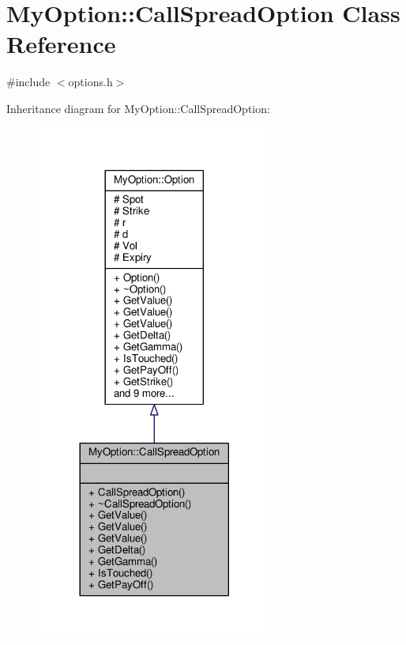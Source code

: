 \hypertarget{classMyOption_1_1CallSpreadOption}{}\section{My\+Option\+:\+:Call\+Spread\+Option Class Reference}
\label{classMyOption_1_1CallSpreadOption}


{\ttfamily \#include $<$options.\+h$>$}



Inheritance diagram for My\+Option\+:\+:Call\+Spread\+Option\+:
\nopagebreak
\begin{figure}[H]
\begin{center}
\leavevmode
\includegraphics[width=221pt]{classMyOption_1_1CallSpreadOption__inherit__graph}
\end{center}
\end{figure}


